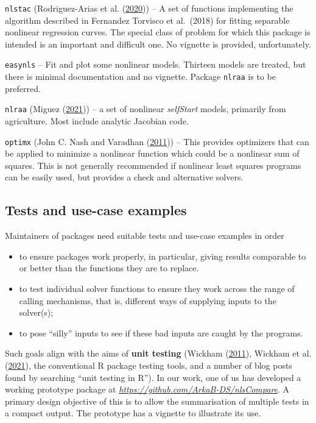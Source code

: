 \texttt{nlstac} (Rodriguez-Arias et al. (\protect\hyperlink{ref-m-nlstac}{2020})) -- A set of functions implementing the algorithm described in
Fernandez Torvisco et al.~(2018) for fitting separable nonlinear regression curves. The
special class of problem for which this package is intended is an important and
difficult one. No vignette is provided, unfortunately.

\texttt{easynls} -- Fit and plot some nonlinear models. Thirteen models are treated, but
there is minimal documentation and no vignette. Package \texttt{nlraa} is to be preferred.

\texttt{nlraa} (Miguez (\protect\hyperlink{ref-MiguezNLRAA2021}{2021})) -- a set of nonlinear \emph{selfStart} models, primarily from
agriculture. Most include analytic Jacobian code.

\texttt{optimx} (John C. Nash and Varadhan (\protect\hyperlink{ref-p-optimx}{2011})) -- This provides
optimizers that can be applied to minimize a nonlinear function which could be
a nonlinear sum of squares. This is not generally recommended if nonlinear
least squares programs can be easily used, but provides a check and alternative
solvers.

\hypertarget{tests-and-use-case-examples}{%
\subsection{Tests and use-case examples}\label{tests-and-use-case-examples}}

Maintainers of packages need suitable tests and use-case examples in order

\begin{itemize}
\tightlist
\item
  to ensure packages work properly, in particular, giving
  results comparable to or better than the functions they are to replace.
\item
  to test individual solver functions to ensure they work across the range of
  calling mechanisms, that is, different ways of supplying inputs to the solver(s);
\item
  to pose ``silly'' inputs to see if these bad inputs are caught by the programs.
\end{itemize}

Such goals align with the aims of \textbf{unit testing}
(Wickham (\protect\hyperlink{ref-HWtestthat11}{2011}), Wickham et al. (\protect\hyperlink{ref-HWdevtools21}{2021}), the conventional R package testing tools, and
a number of blog posts found by searching ``unit testing in R'').
In our work, one of us has developed a working prototype package at \emph{\url{https://github.com/ArkaB-DS/nlsCompare}}.
A primary design objective of this is to allow the summarisation of multiple tests in
a compact output. The prototype has a vignette to illustrate its use.

